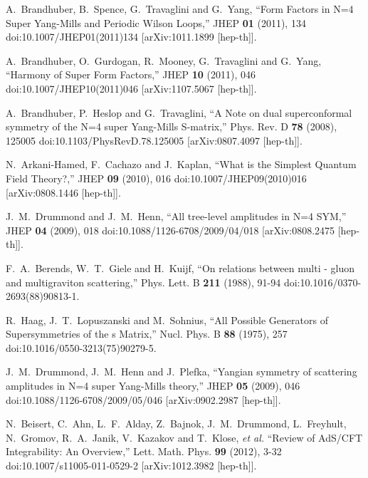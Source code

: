 A.~Brandhuber, B.~Spence, G.~Travaglini and G.~Yang,
``Form Factors in N=4 Super Yang-Mills and Periodic Wilson Loops,''
JHEP \textbf{01} (2011), 134
doi:10.1007/JHEP01(2011)134
[arXiv:1011.1899 [hep-th]].

A.~Brandhuber, O.~Gurdogan, R.~Mooney, G.~Travaglini and G.~Yang,
``Harmony of Super Form Factors,''
JHEP \textbf{10} (2011), 046
doi:10.1007/JHEP10(2011)046
[arXiv:1107.5067 [hep-th]].

A.~Brandhuber, P.~Heslop and G.~Travaglini,
``A Note on dual superconformal symmetry of the N=4 super Yang-Mills S-matrix,''
Phys. Rev. D \textbf{78} (2008), 125005
doi:10.1103/PhysRevD.78.125005
[arXiv:0807.4097 [hep-th]].

N.~Arkani-Hamed, F.~Cachazo and J.~Kaplan,
``What is the Simplest Quantum Field Theory?,''
JHEP \textbf{09} (2010), 016
doi:10.1007/JHEP09(2010)016
[arXiv:0808.1446 [hep-th]].

J.~M.~Drummond and J.~M.~Henn,
``All tree-level amplitudes in N=4 SYM,''
JHEP \textbf{04} (2009), 018
doi:10.1088/1126-6708/2009/04/018
[arXiv:0808.2475 [hep-th]].

F.~A.~Berends, W.~T.~Giele and H.~Kuijf,
``On relations between multi - gluon and multigraviton scattering,''
Phys. Lett. B \textbf{211} (1988), 91-94
doi:10.1016/0370-2693(88)90813-1.

R.~Haag, J.~T.~Lopuszanski and M.~Sohnius,
``All Possible Generators of Supersymmetries of the s Matrix,''
Nucl. Phys. B \textbf{88} (1975), 257
doi:10.1016/0550-3213(75)90279-5.

J.~M.~Drummond, J.~M.~Henn and J.~Plefka,
``Yangian symmetry of scattering amplitudes in N=4 super Yang-Mills theory,''
JHEP \textbf{05} (2009), 046
doi:10.1088/1126-6708/2009/05/046
[arXiv:0902.2987 [hep-th]].

N.~Beisert, C.~Ahn, L.~F.~Alday, Z.~Bajnok, J.~M.~Drummond, L.~Freyhult, N.~Gromov, R.~A.~Janik, V.~Kazakov and T.~Klose, \textit{et al.}
``Review of AdS/CFT Integrability: An Overview,''
Lett. Math. Phys. \textbf{99} (2012), 3-32
doi:10.1007/s11005-011-0529-2
[arXiv:1012.3982 [hep-th]].

